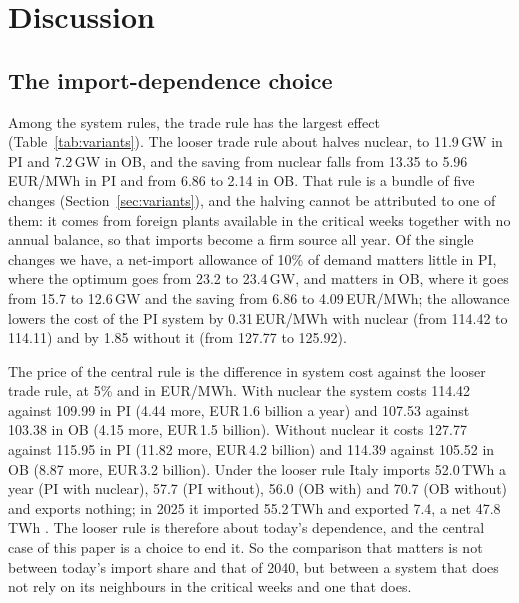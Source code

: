\section{Discussion}\label{sec:discussion}

\subsection{The import-dependence choice}\label{sec:dependence}
Among the system rules, the trade rule has the largest effect (Table~\ref{tab:variants}). The looser trade rule about halves nuclear, to 11.9\,GW in PI and 7.2\,GW in OB, and the saving from nuclear falls from 13.35 to 5.96\,EUR/MWh in PI and from 6.86 to 2.14 in OB. That rule is a bundle of five changes (Section~\ref{sec:variants}), and the halving cannot be attributed to one of them: it comes from foreign plants available in the critical weeks together with no annual balance, so that imports become a firm source all year. Of the single changes we have, a net-import allowance of 10\% of demand matters little in PI, where the optimum goes from 23.2 to 23.4\,GW, and matters in OB, where it goes from 15.7 to 12.6\,GW and the saving from 6.86 to 4.09\,EUR/MWh; the allowance lowers the cost of the PI system by 0.31\,EUR/MWh with nuclear (from 114.42 to 114.11) and by 1.85 without it (from 127.77 to 125.92).

The price of the central rule is the difference in system cost against the looser trade rule, at 5\% and in EUR/MWh. With nuclear the system costs 114.42 against 109.99 in PI (4.44 more, EUR\,1.6 billion a year) and 107.53 against 103.38 in OB (4.15 more, EUR\,1.5 billion). Without nuclear it costs 127.77 against 115.95 in PI (11.82 more, EUR\,4.2 billion) and 114.39 against 105.52 in OB (8.87 more, EUR\,3.2 billion). Under the looser rule Italy imports 52.0\,TWh a year (PI with nuclear), 57.7 (PI without), 56.0 (OB with) and 70.7 (OB without) and exports nothing; in 2025 it imported 55.2\,TWh and exported 7.4, a net 47.8\,TWh \citep{GME2025}. The looser rule is therefore about today's dependence, and the central case of this paper is a choice to end it. So the comparison that matters is not between today's import share and that of 2040, but between a system that does not rely on its neighbours in the critical weeks and one that does.

